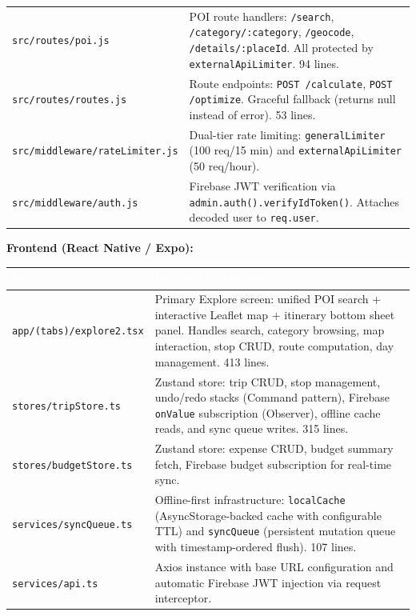 \documentclass[12pt, a4paper]{article}
\newcommand{\thcell}[1]{\textcolor{white}{\textbf{\small #1}}}
\newcommand{\code}[1]{\texttt{\small #1}}
\begin{document}
\begin{longtable}{L{4.5cm} L{9.0cm}}
\code{src/routes/poi.js} & POI route handlers: \code{/search}, \code{/category/:category}, \code{/geocode}, \code{/details/:placeId}. All protected by \code{externalApiLimiter}. 94 lines. \\

\code{src/routes/routes.js} & Route endpoints: \code{POST /calculate}, \code{POST /optimize}. Graceful fallback (returns null instead of error). 53 lines. \\

\code{src/middleware/rateLimiter.js} & Dual-tier rate limiting: \code{generalLimiter} (100 req/15 min) and \code{externalApiLimiter} (50 req/hour). \\

\code{src/middleware/auth.js} & Firebase JWT verification via \code{admin.auth().verifyIdToken()}. Attaches decoded user to \code{req.user}. \\

\end{longtable}

\vspace{0.4em}
\textbf{Frontend (React Native / Expo):}
\begin{longtable}{L{4.5cm} L{9.0cm}}
\toprule
{}
\thcell{File} & \thcell{Role in the Pipeline} \\
\midrule
\endhead
\bottomrule
\endfoot

\code{app/(tabs)/explore2.tsx} & Primary Explore screen: unified POI search + interactive Leaflet map + itinerary bottom sheet panel. Handles search, category browsing, map interaction, stop CRUD, route computation, day management. 413 lines. \\

\code{stores/tripStore.ts} & Zustand store: trip CRUD, stop management, undo/redo stacks (Command pattern), Firebase \code{onValue} subscription (Observer), offline cache reads, and sync queue writes. 315 lines. \\

\code{stores/budgetStore.ts} & Zustand store: expense CRUD, budget summary fetch, Firebase budget subscription for real-time sync. \\

\code{services/syncQueue.ts} & Offline-first infrastructure: \code{localCache} (AsyncStorage-backed cache with configurable TTL) and \code{syncQueue} (persistent mutation queue with timestamp-ordered flush). 107 lines. \\

\code{services/api.ts} & Axios instance with base URL configuration and automatic Firebase JWT injection via request interceptor. \\

\end{longtable}
\end{document}
